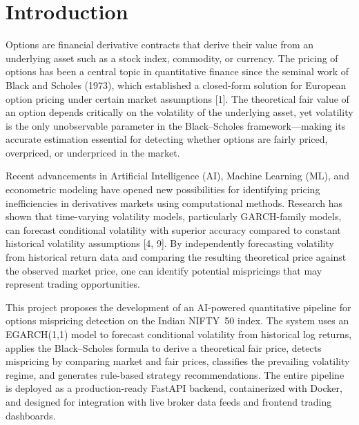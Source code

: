 \documentclass[12pt,a4paper]{article}
\begin{document}
\newpage
\thispagestyle{fancy}
\listoffigures

\newpage
\thispagestyle{fancy}
\listoftables

\newpage
\thispagestyle{fancy}
\section{Introduction}

Options are financial derivative contracts that derive their value from an underlying asset such as a stock index, commodity, or currency. The pricing of options has been a central topic in quantitative finance since the seminal work of Black and Scholes (1973), which established a closed-form solution for European option pricing under certain market assumptions [1]. The theoretical fair value of an option depends critically on the volatility of the underlying asset, yet volatility is the only unobservable parameter in the Black--Scholes framework---making its accurate estimation essential for detecting whether options are fairly priced, overpriced, or underpriced in the market.

Recent advancements in Artificial Intelligence (AI), Machine Learning (ML), and econometric modeling have opened new possibilities for identifying pricing inefficiencies in derivatives markets using computational methods. Research has shown that time-varying volatility models, particularly GARCH-family models, can forecast conditional volatility with superior accuracy compared to constant historical volatility assumptions [4, 9]. By independently forecasting volatility from historical return data and comparing the resulting theoretical price against the observed market price, one can identify potential mispricings that may represent trading opportunities.

This project proposes the development of an AI-powered quantitative pipeline for options mispricing detection on the Indian NIFTY~50 index. The system uses an EGARCH(1,1) model to forecast conditional volatility from historical log returns, applies the Black--Scholes formula to derive a theoretical fair price, detects mispricing by comparing market and fair prices, classifies the prevailing volatility regime, and generates rule-based strategy recommendations. The entire pipeline is deployed as a production-ready FastAPI backend, containerized with Docker, and designed for integration with live broker data feeds and frontend trading dashboards.
\end{document}
